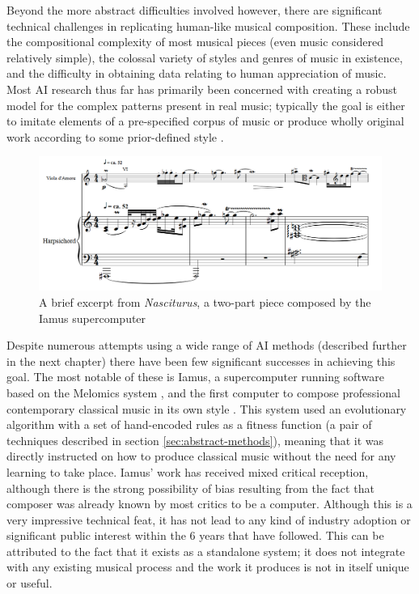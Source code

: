 \documentclass[ author={Stephen Livermore-Tozer},
				supervisor={Dr. Peter Flach},
				degree={MEng},
				title={Algorithmic Co-composition Using Machine Learning},
				subtitle={},
				type={research},
				year={2016} ]{dissertation}
\begin{document}
	Beyond the more abstract difficulties involved however, there are significant technical challenges in replicating human-like musical composition. These include the compositional complexity of most musical pieces (even music considered relatively simple), the colossal variety of styles and genres of music in existence, and the difficulty in obtaining data relating to human appreciation of music. Most AI research thus far has primarily been concerned with creating a robust model for the complex patterns present in real music; typically the goal is either to imitate elements of a pre-specified corpus of music \cite{paiement2007generative,todd1989connectionist} or produce wholly original work according to some prior-defined style \cite{diaz2011composing,burton1998hybrid,horowitz1995representing}. 
	
	\begin{figure}[h]
		\centering
		\includegraphics[width=1.0\textwidth]{Iamus_-_Nasciturus}
		\caption{A brief excerpt from \textit{Nasciturus}, a two-part piece composed by the Iamus supercomputer}
	\end{figure}
	
	Despite numerous attempts using a wide range of AI methods (described further in the next chapter) there have been few significant successes in achieving this goal. The most notable of these is Iamus, a supercomputer running software based on the Melomics system \cite{diaz2011composing}, and the first computer to compose professional contemporary classical music in its own style \cite{scientist2012computer}. This system used an evolutionary algorithm with a set of hand-encoded rules as a fitness function (a pair of techniques described in section \ref{sec:abstract-methods}), meaning that it was directly instructed on how to produce classical music without the need for any learning to take place. Iamus' work has received mixed critical reception, although there is the strong possibility of bias resulting from the fact that composer was already known by most critics to be a computer. Although this is a very impressive technical feat, it has not lead to any kind of industry adoption or significant public interest within the 6 years that have followed. This can be attributed to the fact that it exists as a standalone system; it does not integrate with any existing musical process and the work it produces is not in itself unique or useful.
	
\end{document}
